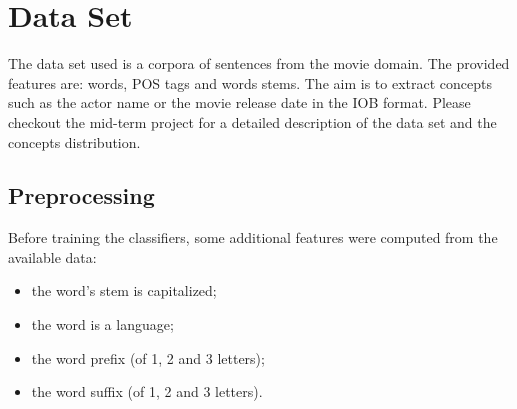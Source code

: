 \section{Data Set}
\label{sec:dataset}

The data set used is a corpora of sentences from the movie domain.
The provided features are: words, \ac{POS} tags and words stems.
The aim is to extract concepts such as the actor name or the movie release date in the \ac{IOB} format.
Please checkout the mid-term project for a detailed description of the data set and the concepts distribution.

\subsection{Preprocessing}
Before training the classifiers, some additional features were computed from the available data:
\begin{itemize}
    \item the word's stem is capitalized;
    \item the word is a language;
    \item the word prefix (of 1, 2 and 3 letters);
    \item the word suffix (of 1, 2 and 3 letters).
\end{itemize}
